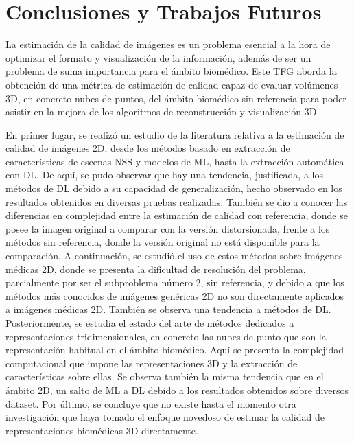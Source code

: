 \chapter{Conclusiones y Trabajos Futuros}
La estimación de la calidad de imágenes es un problema esencial a la hora 
de optimizar el formato y visualización de la información, además de ser 
un problema de suma importancia para el ámbito biomédico. Este TFG aborda 
la obtención de una métrica de estimación de calidad capaz de evaluar volúmenes 
3D, en concreto nubes de puntos, del ámbito biomédico sin referencia para poder asistir 
en la mejora de los algoritmos de reconstrucción y visualización 3D. 

En primer lugar, se realizó un estudio de la literatura relativa a la estimación 
de calidad de imágenes 2D, desde los métodos basado en extracción de características 
de escenas NSS y modelos de ML, hasta la extracción automática con DL. 
De aquí, se pudo observar que hay una tendencia, justificada, a los métodos de DL 
debido a su capacidad de generalización, hecho observado en los resultados obtenidos en diversas 
pruebas realizadas. También se dio a conocer las diferencias en complejidad entre la 
estimación de calidad con referencia, donde se posee la imagen original a comparar con 
la versión distorsionada, frente a los métodos sin referencia, donde la versión 
original no está disponible para la comparación.
A continuación, se estudió el uso de estos métodos sobre imágenes 
médicas 2D, donde se presenta la dificultad de resolución del problema, 
parcialmente por ser el subproblema número 2, sin referencia, y debido a que los 
métodos más conocidos de imágenes genéricas 2D no son directamente aplicados a imágenes 
médicas 2D. También se observa una tendencia a métodos de DL. Posteriormente, 
se estudia el estado del arte de métodos dedicados a representaciones tridimensionales, 
en concreto las nubes de punto que son la representación habitual en el ámbito biomédico. 
Aquí se presenta la complejidad computacional que impone las representaciones 3D y 
la extracción de características sobre ellas. Se observa también la misma tendencia 
que en el ámbito 2D, un salto de ML a DL debido a los resultados obtenidos 
sobre diversos dataset. Por último, se concluye que no existe hasta el momento 
otra investigación que haya tomado el enfoque novedoso de estimar la calidad de 
representaciones biomédicas 3D directamente. 

